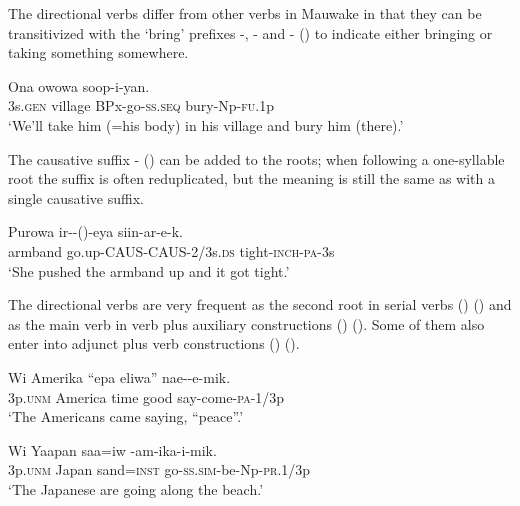 The directional verbs differ from other verbs in Mauwake in that they can be transitivized with the `bring' prefixes -, - and - () to indicate either bringing or taking something somewhere.

\ea%
\label{ex:x286}
\gll Ona owowa  soop-i-yan. \\
3s.\textsc{gen} village BPx-go-\textsc{ss}.\textsc{seq} bury-Np-\textsc{fu}.1p \\
\glt`We'll take him (=his body) in his village and bury him (there).'
\z

The causative suffix \nobreakdash-\textstyleEmphasizedWords{} ()\textstyleEmphasizedWords{} can be added to the roots; when following a one-syllable root the suffix is often reduplicated, but the meaning is still the same as with a single causative suffix.

\ea%
\label{ex:x435}
\gll Purowa ir--()-eya siin-ar-e-k. \\
armband go.up-CAUS-CAUS-2/3s.\textsc{ds} tight-\textsc{inch}-\textsc{pa}-3s\\
\glt`She pushed the armband up and it got tight.'
\z

The directional verbs are very frequent as the second root in serial verbs () () and as the main verb in verb plus auxiliary constructions () (). Some of them also enter into adjunct plus verb constructions () (). 

\ea%
\label{ex:x287}
\gll Wi Amerika ``epa eliwa'' nae--e-mik. \\
3p.\textsc{unm} America time good say-come-\textsc{pa}-1/3p \\
\glt`The Americans came saying, ``peace''.'
\z

\ea%
\label{ex:x288}
\gll Wi Yaapan saa=iw -am-ika-i-mik. \\
3p.\textsc{unm} Japan sand=\textsc{inst} go-\textsc{ss}.\textsc{sim}-be-Np-\textsc{pr}.1/3p \\
\glt`The Japanese are going along the beach.'
\z

